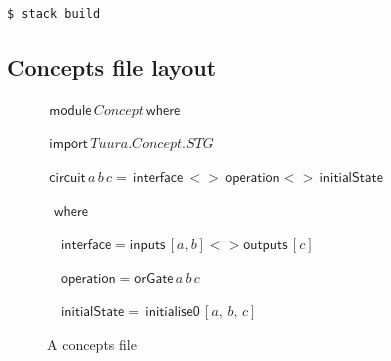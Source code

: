 \documentclass[british,conference,compsoc]{IEEEtran}
\begin{document}
\begin{lstlisting}[language=bash]
  $ stack build
\end{lstlisting}

\subsection{Concepts file layout \label{sub:file_layout}}

\begin{figure}[H]
\begin{centering}

\begin{flushleft}
$\,\mathsf{module}\, Concept \, \mathsf{where}$
\par\end{flushleft}

\begin{flushleft}
$\,\mathsf{import}\, Tuura.Concept.STG$
\par\end{flushleft}

\begin{flushleft}
$\,\mathsf{circuit}\,a \,b \,c=\mathsf{\,interface}\,<> \mathsf{\, operation}
<>\,\mathsf{initialState}$

$\,\,\,\mathsf{where}$
\par\end{flushleft}

\begin{flushleft}
$\,\,\,\,\,\,\mathsf{interface}=\mathsf{inputs}\,[a,b]<>\mathsf{outputs}\,[c]$
\par\end{flushleft}

\begin{flushleft}
$\,\,\,\,\,\,\mathsf{operation}= \mathsf{orGate}\,a\,b\,c$
\par\end{flushleft}

\begin{flushleft}
$\,\,\,\,\,\,\mathsf{initialState}= \, \mathsf{initialise0}\,[a,\,b,\,c]$
\par\end{flushleft}

\par\end{centering}

\begin{centering}
\protect\caption{\label{fig:concepts_file}A concepts file}

\par\end{centering}

\end{figure}
\end{document}
